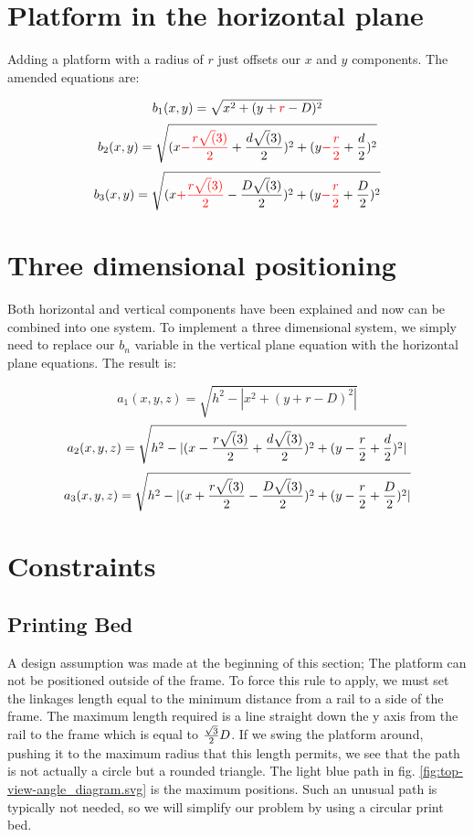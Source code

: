 \documentclass[a4paper, 11pt, twoside]{Thesis}  %
\begin{document}
\section{Platform in the horizontal plane}



Adding a platform with a radius of $r$ just offsets our $x$ and $y$ components. The amended equations are:

$$b_1(x,y) = \sqrt{ x^2 + (y + {\color{red}{r}} - D )^2}$$
$$b_2(x,y) = \sqrt{ ( x {\color{red}{- {r\sqrt(3)\over 2}}}  + {d\sqrt(3)\over 2})^2 + ( y {\color{red}{- {r\over 2}}} + {d\over 2})^2   } $$
$$b_3(x,y) = \sqrt{ ( x {\color{red}{+ {r\sqrt(3)\over 2}}} - {D\sqrt(3)\over 2})^2 + ( y {\color{red}{- {r\over 2}}} + {D\over 2})^2   } $$
\section{Three dimensional positioning }

Both horizontal and vertical components have been explained and now can be combined into one system. To implement a three dimensional system, we simply need to replace our $b_n$ variable in the vertical plane equation with the horizontal plane equations. The result is:

$$a_1(x,y,z) = \sqrt{ h^2 - |{ x^2 + (y + r - D )^2}| }$$
$$a_2(x,y,z) = \sqrt{ h^2 - |{ ( x - {r\sqrt(3)\over 2} + {d\sqrt(3)\over 2})^2 + ( y - {r\over 2} + {d\over 2})^2 }| } $$
$$a_3(x,y,z) = \sqrt{ h^2 -  |{( x + {r\sqrt(3)\over 2} - {D\sqrt(3)\over 2})^2 + ( y - {r\over 2} + {D\over 2})^2   }| } $$
\section{Constraints}

\subsection{Printing Bed}
A design assumption was made at the beginning of this section; The platform can not be positioned outside of the frame. To force this rule to apply, we must set the linkages length equal to the minimum distance from a rail to a side of the frame. The maximum length required is a line straight down the y axis from the rail to the frame which is equal to ${\sqrt{3}\over 2}D$. If we swing the platform around, pushing it to the maximum radius that this length permits, we see that the path is not actually a circle but a rounded triangle. The light blue path in fig. \ref{fig:top-view-angle_diagram.svg} is the maximum positions. Such an unusual path is typically not needed, so we will simplify our problem by using a circular print bed.
\end{document}
